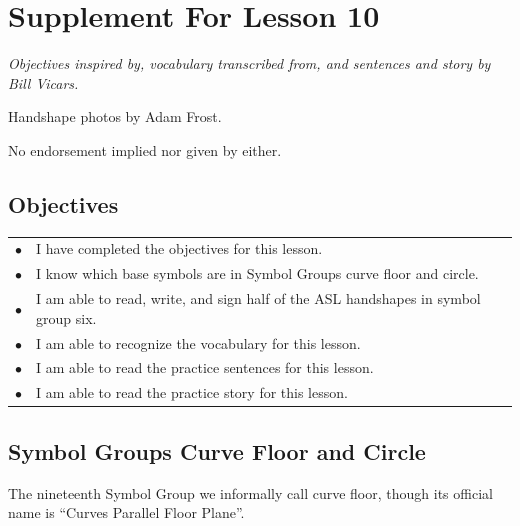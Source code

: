 \documentclass{article}
\begin{document}
\newfontfamily{}
\newfontfamily{}
\newcommand{\bul}{\hfil$\bullet$&}
\renewenvironment{glossary}{\begin{multicols}{5}\begin{center}}{\end{center}\end{multicols}}
\setcounter{secnumdepth}{0}
\setlength{\columnseprule}{1pt}

\section{Supplement For Lesson 10}

\begin{center}
\it
Objectives inspired by, vocabulary transcribed from, and sentences and story by Bill Vicars.

Handshape photos by Adam Frost.

No endorsement implied nor given by either.
\end{center}

\subsection{Objectives}

\begin{tabular}{p{1cm}p{14cm}}
\bul I have completed the objectives for this lesson.\\
\bul I know which base symbols are in Symbol Groups curve floor and circle.\\
\bul I am able to read, write, and sign half of the ASL handshapes in symbol group six.\\
\bul I am able to recognize the vocabulary for this lesson.\\
\bul I am able to read the practice sentences for this lesson.\\
\bul I am able to read the practice story for this lesson.\\
\end{tabular}

\subsection{Symbol Groups Curve Floor and Circle}

The nineteenth Symbol Group we informally call curve floor, though its official name is ``Curves Parallel Floor Plane''.
\end{document}
